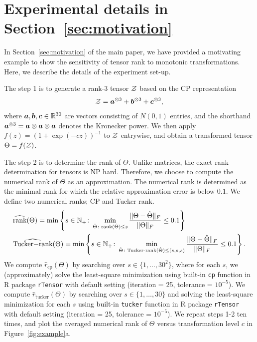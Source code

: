 \documentclass[twoside,11pt]{article}
\theoremstyle{definition}
\def\rank{\textup{rank}}
\begin{document}
\appendix


\section{Experimental details in Section~\ref{sec:motivation}}\label{sec:numericalrank}
In Section~\ref{sec:motivation} of the main paper, we have provided a motivating example to show the sensitivity of tensor rank to monotonic transformations. Here, we describe the details of the experiment set-up. 

The step 1 is to generate a rank-3 tensor $\mathcal{Z}$ based on the CP representation
\[
\mathcal{Z}=\bm{a}^{\otimes 3}+\bm{b}^{\otimes 3}+\bm{c}^{\otimes 3},
\]
where $\bm{a},\bm{b},\bm{c}\in\mathbb{R}^{30}$ are vectors consisting of $N(0,1)$ entries, and the shorthand $\bm{a}^{\otimes 3}=\bm{a}\otimes \bm{a}\otimes \bm{a}$ denotes the Kronecker power. We then apply $f(z)=(1+\exp(-cz))^{-1}$ to $\mathcal{Z}$ entrywise, and obtain a transformed tensor $\Theta=f(\mathcal{Z})$. 

The step 2 is to determine the rank of $\Theta$. Unlike matrices, the exact rank determination for tensors is NP hard. Therefore, we choose to compute the numerical rank of $\Theta$ as an approximation.  The numerical rank is determined as the minimal rank for which the relative approximation error is below $0.1$. We define two numerical ranks; CP and Tucker rank.
\begin{align}\label{eq:numeric}
& \widehat{\rank}(\Theta)=\min\left\{s\in\mathbb{N}_{+}\colon \min_{\hat \Theta\colon \rank(\hat \Theta)\leq s}{\FnormSize{}{\Theta-\hat \Theta}\over \FnormSize{}{\Theta}} \leq 0.1\right\}\\
& \widehat{\text{Tucker$-$rank}}(\Theta)=\min\left\{s\in\mathbb{N}_{+}\colon \min_{\hat \Theta\colon \text{Tucker-rank}(\hat \Theta)\leq (s,s,s)}{\FnormSize{}{\Theta-\hat \Theta}\over \FnormSize{}{\Theta}} \leq 0.1\right\}.
\end{align}
We compute $\hat r_{\text{cp}}(\Theta)$ by searching over $s\in\{1,\ldots,30^2\}$, where for each $s$, we (approximately) solve the least-square minimization using built-in \texttt{cp} function in R package {\tt rTensor} with default setting (iteration = 25, tolerance = $10^{-5}$). 
We compute $\hat r_{\text{tucker}}(\Theta)$ by searching over $s\in\{1,\ldots,30\}$ and solving the least-square minimization for each $s$ using built-in \texttt{tucker} function in R package {\tt rTensor} with default setting (iteration = 25, tolerance = $10^{-5}$). 
We repeat steps 1-2 ten times, and plot the averaged numerical rank of $\Theta$ versus transformation level $c$ in Figure~\ref{fig:example}a.  
\end{document}
